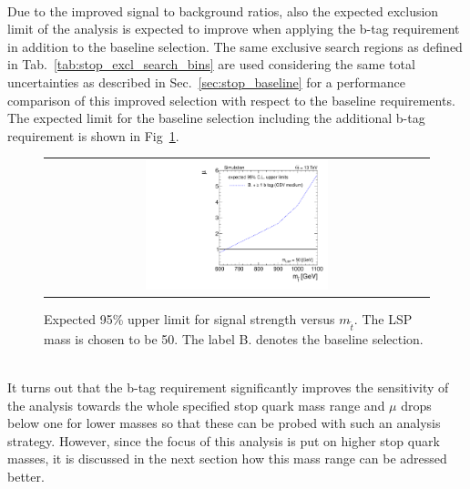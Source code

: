 \\
Due to the improved signal to background ratios, also the expected exclusion limit of the analysis is expected to improve when applying the b-tag requirement in addition to the baseline selection. The same exclusive search regions as defined in Tab.~\ref{tab:stop_excl_search_bins} are used considering the same total uncertainties as described in Sec.~\ref{sec:stop_baseline} for a performance comparison of this improved selection with respect to the baseline requirements. The expected limit for the baseline selection including the additional b-tag requirement is shown in Fig~\ref{fig:stop_baselinebtag_limit}. 
\begin{figure}[!h]
  \centering
  \begin{tabular}{c}
                \includegraphics[width=0.49\textwidth]{figures/limitplot4BinSel_BaselineBTag_LSP50.pdf} 
  \end{tabular}
  \caption{Expected 95\% upper limit for signal strength versus $m_{\tilde{t}}$. The LSP mass is chosen to be 50\gev. The label B. denotes the baseline selection.}
  \label{fig:stop_baselinebtag_limit}
\end{figure}
\\
It turns out that the b-tag requirement significantly improves the sensitivity of the analysis towards the whole specified stop quark mass range and $\mu$ drops below one for lower masses so that these can be probed with such an analysis strategy. However, since the focus of this analysis is put on higher stop quark masses, it is discussed in the next section how this mass range can be adressed better.  

